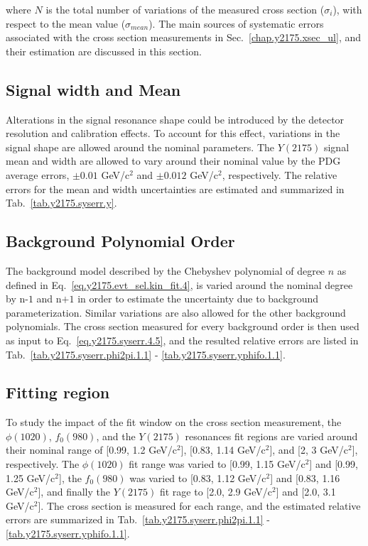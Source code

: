 \noindent where $N$ is the total number of variations of the measured cross section ($\sigma_{i}$), with respect to the mean value ($\sigma_{mean}$). The main sources of systematic errors associated with the cross section measurements in Sec.~\ref{chap.y2175.xsec_ul}, and their estimation are discussed in this section.

\subsection{Signal width and Mean}
\label{chap.y2175.syserr.sig}

Alterations in the signal resonance shape could be introduced by the detector resolution and calibration effects. To account for this effect, variations in the signal shape are allowed around the nominal parameters. The $Y(2175)$ signal mean and width are allowed to vary around their nominal value by the PDG average errors, $\pm 0.01$ GeV/c$^2$ and $\pm 0.012$ GeV/c$^2$, respectively. The relative errors for the mean and width uncertainties are estimated and summarized in Tab.~\ref{tab.y2175.syserr.y}.

\subsection{Background Polynomial Order}
\label{chap.y2175.syserr.bkg}

The background model described by the Chebyshev polynomial of degree $n$ as defined in Eq.~\ref{eq.y2175.evt_sel.kin_fit.4}, is varied around the nominal degree by $\mbox{n-1}$ and $\mbox{n+1}$ in order to estimate the uncertainty due to background parameterization. Similar variations are also allowed for the other background polynomials. The cross section measured for every background order is then used as input to Eq.~\ref{eq.y2175.syserr.4.5}, and the resulted relative errors are listed in Tab.~\ref{tab.y2175.syserr.phi2pi.1.1} - \ref{tab.y2175.syserr.yphifo.1.1}.

\subsection{Fitting region}
\label{chap.y2175.syserr.range}

To study the impact of the fit window on the cross section measurement, the $\phi(1020)$, $f_{0}(980)$, and the $Y(2175)$  resonances fit regions are varied around their nominal range of [0.99, 1.2 GeV/c$^2$], [0.83, 1.14 GeV/c$^2$], and [2, 3 GeV/c$^2$], respectively. The $\phi(1020)$ fit range was varied to [0.99, 1.15 GeV/c$^2$] and [0.99, 1.25 GeV/c$^2$], the $f_{0}(980)$ was varied to [0.83, 1.12 GeV/c$^2$] and [0.83, 1.16 GeV/c$^2$], and finally the $Y(2175)$ fit rage to [2.0, 2.9 GeV/c$^2$] and [2.0, 3.1 GeV/c$^2$]. The cross section is measured for each range, and the estimated relative errors are summarized in Tab.~\ref{tab.y2175.syserr.phi2pi.1.1} - \ref{tab.y2175.syserr.yphifo.1.1}.

